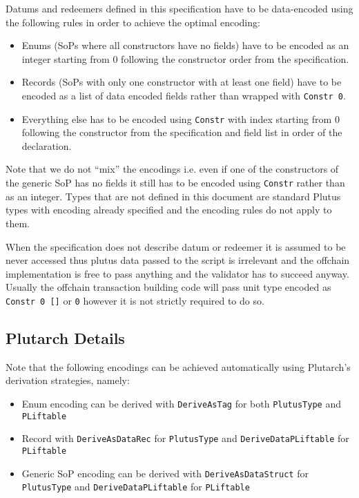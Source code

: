 \documentclass{article}
\begin{document}
Datums and redeemers defined in this specification have to be data-encoded using the following rules in order to achieve the optimal encoding:

\begin{itemize}
  \item Enums (SoPs where all constructors have no fields) have to be encoded as an integer starting from $0$ following the constructor order from the specification.
  \item Records (SoPs with only one constructor with at least one field) have to be encoded as a list of data encoded fields rather than wrapped with \verb|Constr 0|.
  \item Everything else has to be encoded using \verb|Constr| with index starting from $0$ following the constructor from the specification and field list in order of the declaration.
\end{itemize}

Note that we do not ``mix'' the encodings i.e. even if one of the constructors of the generic SoP has no fields it still has to be encoded using \verb|Constr| rather than as an integer.
Types that are not defined in this document are standard Plutus types with encoding already specified and the encoding rules do not apply to them.

When the specification does not describe datum or redeemer it is assumed to be never accessed thus plutus data passed to the script is irrelevant and the offchain implementation is free to pass anything and the validator has to succeed anyway.
Usually the offchain transaction building code will pass unit type encoded as \verb|Constr 0 []| or \verb|0| however it is not strictly required to do so.

\subsection{Plutarch Details}

Note that the following encodings can be achieved automatically using Plutarch's derivation strategies, namely:

\begin{itemize}
  \item Enum encoding can be derived with \verb|DeriveAsTag| for both \verb|PlutusType| and \verb|PLiftable|
  \item Record with \verb|DeriveAsDataRec| for \verb|PlutusType| and \allowbreak \verb|DeriveDataPLiftable| for \verb|PLiftable|
  \item Generic SoP encoding can be derived with \verb|DeriveAsDataStruct| for \verb|PlutusType| and \verb|DeriveDataPLiftable| for \verb|PLiftable|
\end{itemize}
\end{document}
